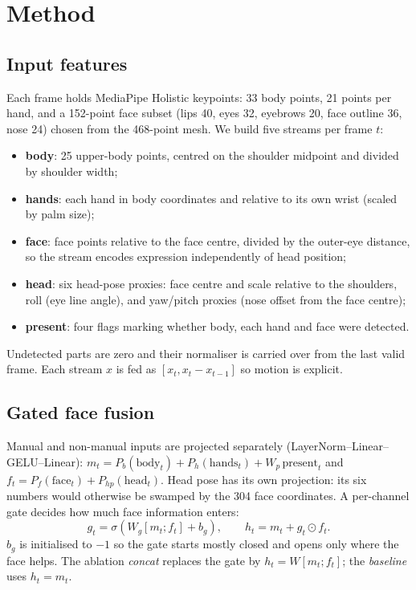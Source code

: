 \documentclass[11pt]{article}
\begin{document}
\section{Method}

\subsection{Input features}
Each frame holds MediaPipe Holistic \citep{lugaresi2019mediapipe} keypoints: 33 body points, 21 points
per hand, and a 152-point face subset (lips 40, eyes 32, eyebrows 20, face outline 36, nose 24) chosen
from the 468-point mesh. We build five streams per frame $t$:
\begin{itemize}
\item \textbf{body}: 25 upper-body points, centred on the shoulder midpoint and divided by shoulder width;
\item \textbf{hands}: each hand in body coordinates and relative to its own wrist (scaled by palm size);
\item \textbf{face}: face points relative to the face centre, divided by the outer-eye distance, so the
  stream encodes expression independently of head position;
\item \textbf{head}: six head-pose proxies: face centre and scale relative to the shoulders, roll (eye
  line angle), and yaw/pitch proxies (nose offset from the face centre);
\item \textbf{present}: four flags marking whether body, each hand and face were detected.
\end{itemize}
Undetected parts are zero and their normaliser is carried over from the last valid frame. Each stream
$x$ is fed as $[x_t, x_t - x_{t-1}]$ so motion is explicit.

\subsection{Gated face fusion}
Manual and non-manual inputs are projected separately (LayerNorm--Linear--GELU--Linear):
$m_t = P_b(\text{body}_t) + P_h(\text{hands}_t) + W_p\,\text{present}_t$ and
$f_t = P_f(\text{face}_t) + P_{hp}(\text{head}_t)$. Head pose has its own projection: its six numbers
would otherwise be swamped by the 304 face coordinates. A per-channel gate decides how much face
information enters:
\begin{equation}
  g_t = \sigma\!\left(W_g [m_t; f_t] + b_g\right), \qquad h_t = m_t + g_t \odot f_t .
\end{equation}
$b_g$ is initialised to $-1$ so the gate starts mostly closed and opens only where the face helps. The
ablation \emph{concat} replaces the gate by $h_t = W[m_t; f_t]$; the \emph{baseline} uses $h_t = m_t$.
\end{document}
